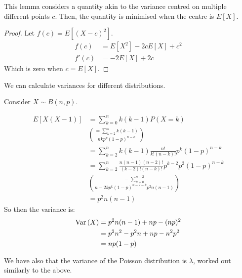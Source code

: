 \documentclass[../Main.tex]{subfiles}
\begin{document}
This lemma considers a quantity akin to the variance centred on multiple different points $c$. Then, the quantity is minimised when the centre is $E[X]$.
\begin{proof}
    Let $f(c) = E\left[(X - c)^2\right]$.
    \begin{align*}
        f(c) &= E[X^2] - 2cE[X] + c^2 \\
        f'(c) &= -2E[X] + 2c
    \end{align*}
    Which is zero when $c = E[X]$.
\end{proof}
We can calculate variances for different distributions.
\begin{example}
    Consider $X \sim B(n, p)$.\par
    \begin{align*}
        E[X(X-1)] &= \sum_{k=0}^n k(k-1) P(X = k) \\
        &= \sum_{k=2}^n k(k-1) \choose{n}{k} p^k (1-p)^{n-k} \\
        &= \sum_{k=2}^n k(k-1) \frac{n!}{k!(n-k)!} p^k (1-p)^{n-k} \\
        &= \sum_{k=2}^n \frac{n(n-1)(n-2)!}{(k-2)!(n-k)!} p^{k-2} p^2 (1-p)^{n-k} \\
        &= \sum_{k=0}^{n-2} \choose{n-2}{k} p^{k} (1-p)^{n-2-k} p^2 n(n-1) \\
        &= p^2 n(n-1)
    \end{align*}
    So then the variance is:
    \begin{align*}
        \operatorname{Var}{(X)} &= p^2 n(n-1) + np - (np)^2 \\
        &= p^2 n^2 - p^2 n + np - n^2 p^2 \\
        &= np(1-p)
    \end{align*}
\end{example}
We have also that the variance of the Poisson distribution is $\lambda$, worked out similarly to the above.
\end{document}
